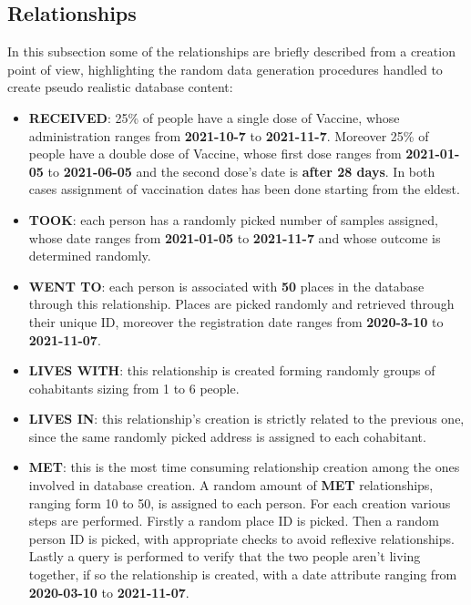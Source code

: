 \documentclass{article}[IEEEtran]
\begin{document}
\subsection{Relationships}
In this subsection some of the relationships are briefly described from a creation point of view, highlighting the random data generation procedures handled to create pseudo realistic database content:

\begin{itemize}

    \item \textbf{RECEIVED}: 25\% of people have a single dose of Vaccine, whose administration ranges from \textbf{2021-10-7} to \textbf{2021-11-7}. Moreover 25\% of people have a double dose of Vaccine, whose first dose ranges from \textbf{2021-01-05} to \textbf{2021-06-05} and the second dose's date is \textbf{after 28 days}. In both cases assignment of vaccination dates has been done starting from the eldest.
    
    \item \textbf{TOOK}: each person has a randomly picked number of samples assigned, whose date ranges from \textbf{2021-01-05} to \textbf{2021-11-7} and whose outcome is determined randomly.
    
    \item \textbf{WENT TO}: each person is associated with \textbf{50} places in the database through this relationship. Places are picked randomly and retrieved through their unique ID, moreover the registration date ranges from \textbf{2020-3-10} to \textbf{2021-11-07}.
    
    \item \textbf{LIVES WITH}: this relationship is created forming randomly groups of cohabitants sizing from 1 to 6 people. 
    
    \item \textbf{LIVES IN}: this relationship's creation is strictly related to the previous one, since the same randomly picked address is assigned to each cohabitant.
    
    \item \textbf{MET}: this is the most time consuming relationship creation among the ones involved in database creation. A random amount of \textbf{MET} relationships, ranging form 10 to 50, is assigned to each person. For each creation
    various steps are performed. Firstly a random place ID is picked. Then a random person ID is picked, with appropriate checks to avoid reflexive relationships. Lastly a query is performed to verify that the two people aren't living together, if so the relationship is created, with a date attribute ranging from \textbf{2020-03-10} to \textbf{2021-11-07}.
    
\end{itemize}
\end{document}
